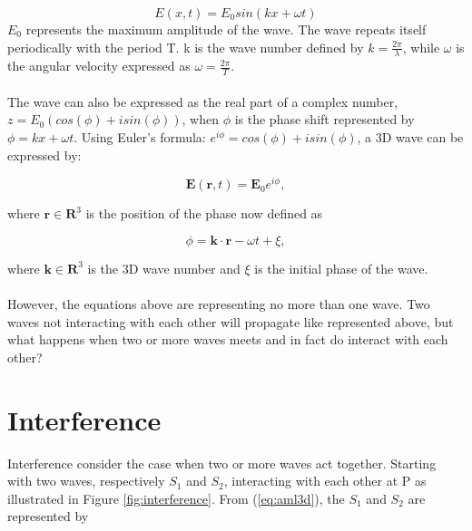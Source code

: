 \begin{equation}
    E(x,t) = E_0 sin(kx+\omega t)
    \label{eq:aml2d}
\end{equation}
$E_0$ represents the maximum amplitude of the wave. The wave repeats itself periodically with the period T. k is the wave number defined by $k= \frac{2 \pi}{\lambda}$, while $\omega$ is the angular velocity expressed as $\omega = \frac{2 \pi}{T}$.
\\\\
The wave can also be expressed as the real part of a complex number, $z = E_0(cos(\phi) + i sin(\phi))$, when $\phi$ is the phase shift represented by $\phi = kx + \omega t$. Using Euler's formula: $e^{i \phi} = cos(\phi) + i sin(\phi)$, a 3D wave can be expressed by: 

\begin{equation}
    \textbf{E}(\textbf{r},t) = \textbf{E}_0 e^{i \phi},
    \label{eq:aml3d}
\end{equation}

where $\textbf{r} \in \textbf{R}^3$ is the position of the phase now defined as 

\begin{equation}
    \phi = \textbf{k}\cdot \textbf{r} - \omega t + \xi,
    \label{eq:phase}
\end{equation}

where $\textbf{k} \in \textbf{R}^3$ is the 3D wave number and $\xi$ is the initial phase of the wave. 
\\\\
However, the equations above are representing no more than one wave. Two waves not interacting with each other will propagate like represented above, but what happens when two or more waves meets and in fact do interact with each other? 

\vspace{1.3cm}
\section{Interference} \label{sec:interference}
Interference consider the case when two or more waves act together. Starting with two waves, respectively $S_1$ and $S_2$, interacting with each other at P as illustrated in Figure \ref{fig:interference}. From (\ref{eq:aml3d}), the $S_1$ and $S_2$ are represented by


